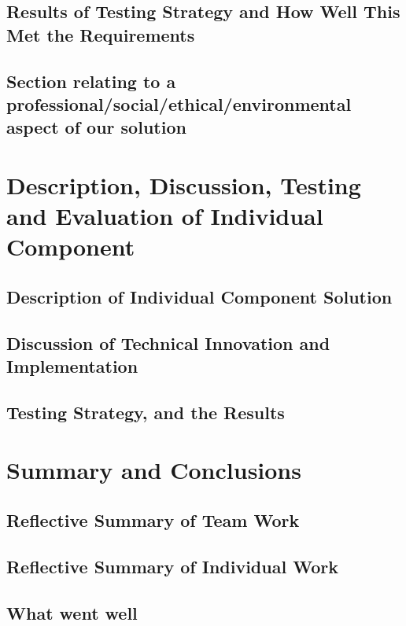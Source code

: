 \documentclass[a4paper]{report}
\begin{document}
\section{Results of Testing Strategy and How Well This Met the Requirements}
\section{Section relating to a professional/social/ethical/environmental 
        aspect of our solution} %

\chapter{Description, Discussion, Testing and Evaluation of 
            Individual Component}
\section{Description of Individual Component Solution}
\section{Discussion of Technical Innovation and Implementation}
\section{Testing Strategy, and the Results}

\chapter{Summary and Conclusions}
\section{Reflective Summary of Team Work}
\section{Reflective Summary of Individual Work}
\section{What went well}
\end{document}
